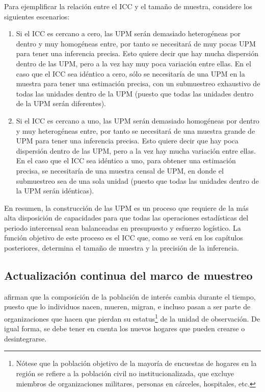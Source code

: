 \documentclass[
  12pt,
  spanish,
]{book}
\begin{document}
Para ejemplificar la relación entre el ICC y el tamaño de muestra, considere los siguientes escenarios:

\begin{enumerate}
\def\labelenumi{\arabic{enumi}.}
\item
  Si el ICC es cercano a cero, las UPM serán demasiado heterogéneas por dentro y muy homogéneas entre, por tanto se necesitará de muy pocas UPM para tener una inferencia precisa. Esto quiere decir que hay mucha dispersión dentro de las UPM, pero a la vez hay muy poca variación entre ellas. En el caso que el ICC sea idéntico a cero, sólo se necesitaría de una UPM en la muestra para tener una estimación precisa, con un submuestreo exhaustivo de todas las unidades dentro de la UPM (puesto que todas las unidades dentro de la UPM serán diferentes).
\item
  Si el ICC es cercano a uno, las UPM serán demasiado homogéneas por dentro y muy heterogéneas entre, por tanto se necesitará de una muestra grande de UPM para tener una inferencia precisa. Esto quiere decir que hay poca dispersión dentro de las UPM, pero a la vez hay mucha variación entre ellas. En el caso que el ICC sea idéntico a uno, para obtener una estimación precisa, se necesitaría de una muestra censal de UPM, en donde el submuestreo sea de una sola unidad (puesto que todas las unidades dentro de la UPM serán idénticas).
\end{enumerate}

En resumen, la construcción de las UPM es un proceso que requiere de la más alta disposición de capacidades para que todas las operaciones estadísticas del periodo intercensal sean balanceadas en presupuesto y esfuerzo logístico. La función objetivo de este proceso es el ICC que, como se verá en los capítulos posteriores, determina el tamaño de muestra y la precisión de la inferencia.

\hypertarget{actualizaciuxf3n-continua-del-marco-de-muestreo}{%
\subsection*{Actualización continua del marco de muestreo}\label{actualizaciuxf3n-continua-del-marco-de-muestreo}}

\citet[pág. 105]{Duncan_Kalton_1987} afirman que la composición de la población de interés cambia durante el tiempo, puesto que lo individuos nacen, mueren, migran, e incluso pasan a ser parte de organizaciones que hacen que pierdan su estatus\footnote{Nótese que la población objetivo de la mayoría de encuestas de hogares en la región se refiere a la población civil no institucionalizada, que excluye miembros de organizaciones militares, personas en cárceles, hospitales, etc.} de la unidad de observación. De igual forma, se debe tener en cuenta los nuevos hogares que pueden crearse o desintegrarse.
\end{document}
